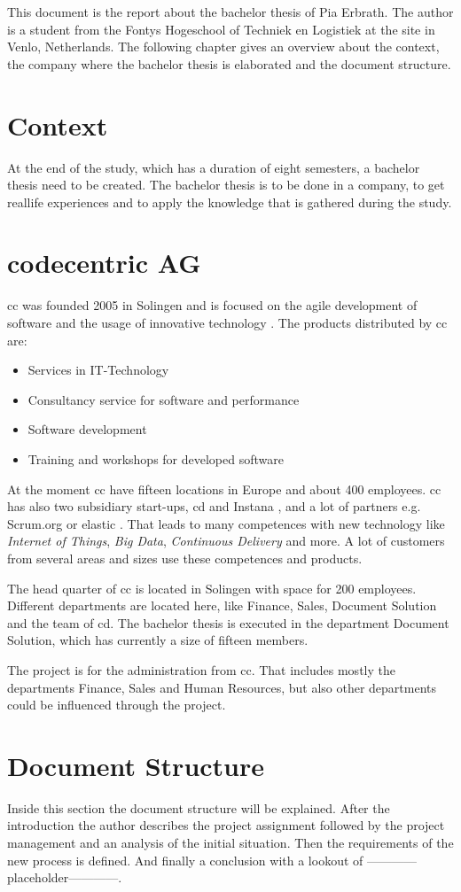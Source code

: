 This document is the report about the bachelor thesis of Pia Erbrath. The author is a student from the Fontys Hogeschool of Techniek en Logistiek at the site in Venlo, Netherlands. The following chapter gives an overview about the context, the company where the bachelor thesis is elaborated and the document structure.

\section{Context}
At the end of the study, which has a duration of eight semesters, a bachelor thesis need to be created. The bachelor thesis is to be done in a company, to get \flqq real\frqq life experiences and to apply the knowledge that is gathered during the study.  

\section{codecentric AG}
\Gls{cc} was founded 2005 in Solingen and is focused on the agile development of software and the usage of innovative technology \parencite{codecentric2018unternehmen}. The products distributed by \gls{cc} are: 
\begin{itemize}
	\item Services in \gls{IT}-Technology
	\item Consultancy service for software and performance
	\item Software development
	\item Training and workshops for developed software
\end{itemize}
At the moment \gls{cc} have fifteen locations in Europe and about 400 employees. \Gls{cc} has also two subsidiary start-ups, \gls{cd} and Instana \parencite{codecentric2018startups}, and a lot of partners e.g. Scrum.org or elastic \parencite{codecentric2018partner}.
That leads to many competences with new technology like \textit{Internet of Things}, \textit{Big Data}, \textit{Continuous Delivery} and more.
A lot of customers from several areas and sizes use these competences and products.

The head quarter of \gls{cc} is located in Solingen with space for 200 employees. Different departments are located here, like Finance, Sales, Document Solution and the team of \gls{cd}.   
The bachelor thesis is executed in the department Document Solution, which has currently a size of fifteen members.

The project is for the administration from \gls{cc}. That includes mostly the departments Finance, Sales and Human Resources, but also other departments could be influenced through the project.

\section{Document Structure}
Inside this section the document structure will be explained. After the introduction the author describes the project assignment followed by the project management and an analysis of the initial situation. Then the requirements of the new process is defined. And finally a conclusion with a lookout of ------------placeholder------------.